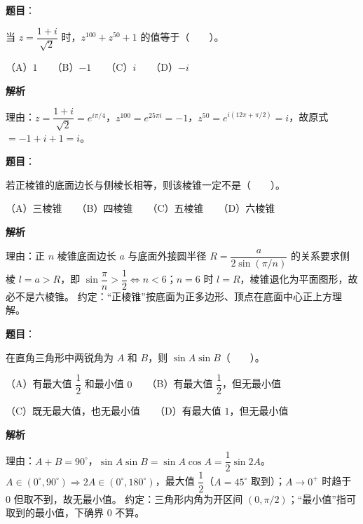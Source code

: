 \begin{answer}

\textbf{题目}：

当 $z=\dfrac{1+i}{\sqrt2}$ 时，$z^{100}+z^{50}+1$ 的值等于\mbox{（　　）}。

（A）$1$　　（B）$-1$　　（C）$i$　　（D）$-i$

\textbf{解析}

理由：$z=\dfrac{1+i}{\sqrt2}=e^{i\pi/4}$，$z^{100}=e^{25\pi i}=-1$，$z^{50}=e^{i(12\pi+\pi/2)}=i$，故原式 $=-1+i+1=i$。


\end{answer}
\begin{answer}

\textbf{题目}：

若正棱锥的底面边长与侧棱长相等，则该棱锥一定不是\mbox{（　　）}。

（A）三棱锥　　（B）四棱锥　　（C）五棱锥　　（D）六棱锥

\textbf{解析}

理由：正 $n$ 棱锥底面边长 $a$ 与底面外接圆半径 $R=\dfrac{a}{2\sin(\pi/n)}$ 的关系要求侧棱 $l=a>R$，即 $\sin\dfrac{\pi}{n}>\dfrac12\Leftrightarrow n<6$；$n=6$ 时 $l=R$，棱锥退化为平面图形，故必不是六棱锥。
约定：“正棱锥”按底面为正多边形、顶点在底面中心正上方理解。


\end{answer}
\begin{answer}

\textbf{题目}：

在直角三角形中两锐角为 $A$ 和 $B$，则 $\sin A\sin B$\mbox{（　　）}。

（A）有最大值 $\dfrac12$ 和最小值 $0$　　（B）有最大值 $\dfrac12$，但无最小值

（C）既无最大值，也无最小值　　（D）有最大值 $1$，但无最小值

\textbf{解析}

理由：$A+B=90^\circ$，$\sin A\sin B=\sin A\cos A=\dfrac12\sin2A$。$A\in(0^\circ,90^\circ)\Rightarrow 2A\in(0^\circ,180^\circ)$，最大值 $\dfrac12$（$A=45^\circ$ 取到）；$A\to0^+$ 时趋于 $0$ 但取不到，故无最小值。
约定：三角形内角为开区间 $(0,\pi/2)$；“最小值”指可取到的最小值，下确界 $0$ 不算。


\end{answer}
